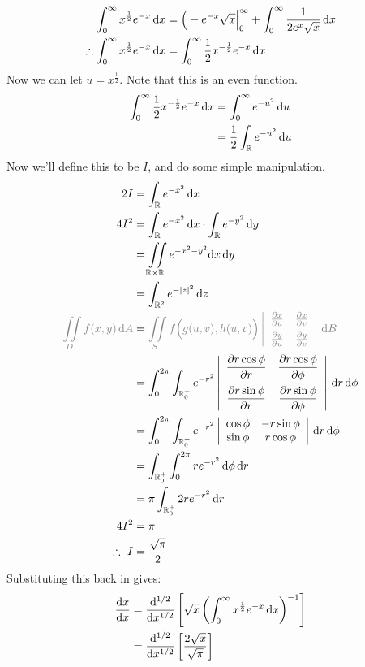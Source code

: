 \documentclass[a4paper, twoside]{article}
\makeatletter
\renewcommand{\d}{\mathrm{d}}
\newcommand{\R}{\mathbb{R}}
\def\mathcolor#1#{\@mathcolor{#1}}
\def\@mathcolor#1#2#3{%
  \protect\leavevmode
  \begingroup
    \color#1{#2}#3%
  \endgroup
}
\makeatother
\begin{document}
\begin{align*}
    \int_{0}^{\infty}{x^{\frac{1}{2}}e^{-x}\,\text{d} x}&=\left( \Big.-e^{-x}\sqrt{x}\right|_{0}^{\infty}+\int_{0}^{\infty}{\frac{1}{2e^x\sqrt{x}}\,\text{d} x}\\
    \therefore \int_{0}^{\infty}{x^{\frac{1}{2}}e^{-x}\,\text{d} x}&=\int_{0}^{\infty}{\frac{1}{2}x^{-\frac{1}{2}}e^{-x}\,\text{d} x}
\end{align*}
Now we can let \(u=x^{\frac{1}{2}}\). Note that this is an even function.
\begin{align*}
    \Int{0}{\infty}{\frac{1}{2}x^{-\frac{1}{2}}e^{-x}}{x}&=\Int{0}{\infty}{e^{-u^2}}{u}\\
    &=\frac{1}{2}\lInt{\R}{e^{-u^2}}{u}
\end{align*}
Now we'll define this to be $I$, and do some simple manipulation.
\begin{align*}
    2I&=\lInt{\R}{e^{-x^2}}{x}\\
    4I^2&=\lInt{\R}{e^{-x^2}}{x}\cdot\lInt{\R}{e^{-y^2}}{y}\\
    &=\iint\limits_{\R\times\R}{e^{-x^2-y^2}}\d x\,\d y\\
    &=\lInt{\R^2}{e^{-\modu{z}^2}}{z}\\
    \mathcolor{gray}{\lIInt{D}{f(x,y)}{A}}&=\mathcolor{gray}{\lIInt{S}{f\Big(g(u,v),h(u,v)\Big)\modu{\begin{array}{cc}
        \pdiff{x}{u} & \pdiff{x}{v} \vspace{0.5em}\\
        \pdiff{y}{u} & \pdiff{y}{v}
    \end{array}}}{B}}\\
    &=\IInt{0}{2\pi}{\R_0^+}{}{e^{-r^2}\modu{\begin{array}{cc}\displaystyle
        \pdiff{r\cos\phi}{r} &\displaystyle \pdiff{r\cos\phi}{\phi} \vspace{0.5em}\\\displaystyle
        \pdiff{r\sin\phi}{r} &\displaystyle \pdiff{r\sin\phi}{\phi}
    \end{array}}}{r}{\phi}\\
    &=\IInt{0}{2\pi}{\R_0^+}{}{e^{-r^2}\modu{\begin{array}{cc}
        \cos\phi & -r\sin\phi \\
        \sin\phi & r\cos\phi
    \end{array}}}{r}{\phi}\\
    &=\Int{\R_0^+}{}{\Int{0}{2\pi}{re^{-r^2}}{\phi}}{r}\\
    &=\pi\Int{\R_0^+}{}{2re^{-r^2}}{r}\\
    4I^2&=\pi\\
    \therefore \ I&=\frac{\sqrt{\pi}}{2}
\end{align*}
Substituting this back in gives:
\begin{align*}
    \diff{x}{x}&=\ndiff{1/2}{}{x}\left[\sqrt{x}\left(\Int{0}{\infty}{x^{\frac{1}{2}}e^{-x}}{x}\right)^{-1}\right]\\
    &=\ndiff{1/2}{}{x}\left[\frac{2\sqrt{x}}{\sqrt{\pi}}\right]
\end{align*}
\end{document}
